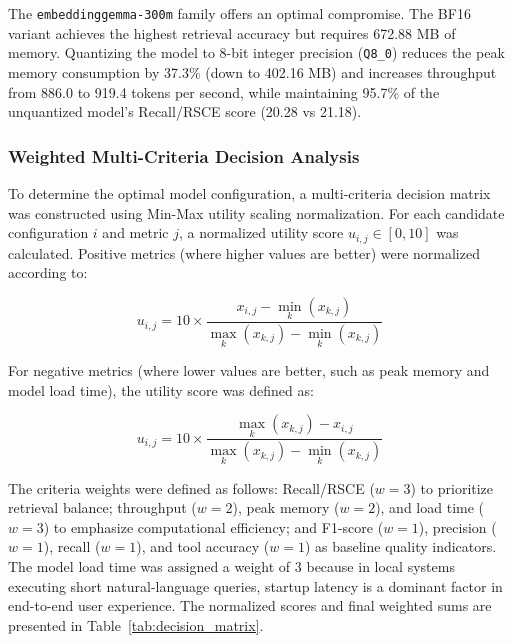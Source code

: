 The \texttt{embeddinggemma-300m} family offers an optimal compromise. The BF16 variant achieves the highest retrieval accuracy but requires 672.88 MB of memory. Quantizing the model to 8-bit integer precision (\texttt{Q8\_0}) reduces the peak memory consumption by 37.3\% (down to 402.16 MB) and increases throughput from 886.0 to 919.4 tokens per second, while maintaining 95.7\% of the unquantized model's Recall/RSCE score (20.28 vs 21.18). 

\subsubsection{Weighted Multi-Criteria Decision Analysis}

To determine the optimal model configuration, a multi-criteria decision matrix was constructed using Min-Max utility scaling normalization. For each candidate configuration $i$ and metric $j$, a normalized utility score $u_{i,j} \in [0, 10]$ was calculated. Positive metrics (where higher values are better) were normalized according to:

$$u_{i,j} = 10 \times \frac{x_{i,j} - \min_k(x_{k,j})}{\max_k(x_{k,j}) - \min_k(x_{k,j})}$$

For negative metrics (where lower values are better, such as peak memory and model load time), the utility score was defined as:

$$u_{i,j} = 10 \times \frac{\max_k(x_{k,j}) - x_{i,j}}{\max_k(x_{k,j}) - \min_k(x_{k,j})}$$

The criteria weights were defined as follows: Recall/RSCE ($w=3$) to prioritize retrieval balance; throughput ($w=2$), peak memory ($w=2$), and load time ($w=3$) to emphasize computational efficiency; and F1-score ($w=1$), precision ($w=1$), recall ($w=1$), and tool accuracy ($w=1$) as baseline quality indicators. The model load time was assigned a weight of 3 because in local systems executing short natural-language queries, startup latency is a dominant factor in end-to-end user experience. The normalized scores and final weighted sums are presented in Table~\ref{tab:decision_matrix}.

